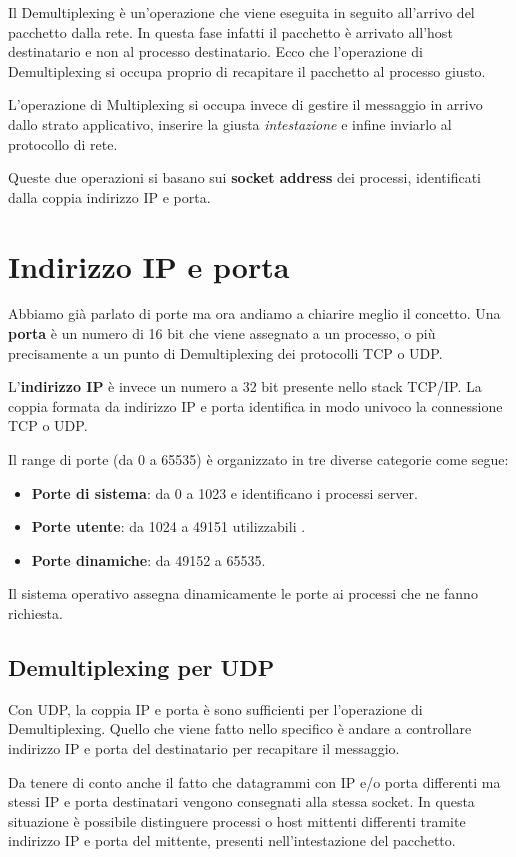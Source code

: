 Il Demultiplexing è un'operazione che viene eseguita in seguito all'arrivo del pacchetto dalla
rete. In questa fase infatti il pacchetto è arrivato all'host destinatario e non al processo
destinatario. Ecco che l'operazione di Demultiplexing si occupa proprio di recapitare il pacchetto
al processo giusto.

L'operazione di Multiplexing si occupa invece di gestire il messaggio in arrivo dallo strato
applicativo, inserire la giusta \emph{intestazione} e infine inviarlo al protocollo di rete.

Queste due operazioni si basano sui \textbf{socket address} dei processi, identificati dalla coppia
indirizzo IP e porta.

\section{Indirizzo IP e porta}
Abbiamo già parlato di porte ma ora andiamo a chiarire meglio il concetto. Una \textbf{porta} è
un numero di 16 bit che viene assegnato a un processo, o più precisamente a un punto di
Demultiplexing dei protocolli TCP o UDP.

L'\textbf{indirizzo IP} è invece un numero a 32 bit presente nello stack TCP/IP. La coppia formata
da indirizzo IP e porta identifica in modo univoco la connessione TCP o UDP.

Il range di porte (da 0 a 65535) è organizzato in tre diverse categorie come segue:
\begin{itemize}
	\item \textbf{Porte di sistema}: da 0 a 1023 e identificano i processi server.
	\item \textbf{Porte utente}: da 1024 a 49151 utilizzabili .
	\item \textbf{Porte dinamiche}: da 49152 a 65535.
\end{itemize}
Il sistema operativo assegna dinamicamente le porte ai processi che ne fanno richiesta.

\subsection{Demultiplexing per UDP}
Con UDP, la coppia IP e porta è sono sufficienti per l'operazione di Demultiplexing. Quello che
viene fatto nello specifico è andare a controllare indirizzo IP e porta del destinatario per
recapitare il messaggio.

Da tenere di conto anche il fatto che datagrammi con IP e/o porta differenti ma stessi IP e porta
destinatari vengono consegnati alla stessa socket. In questa situazione è possibile distinguere
processi o host mittenti differenti tramite indirizzo IP e porta del mittente, presenti
nell'intestazione del pacchetto.

